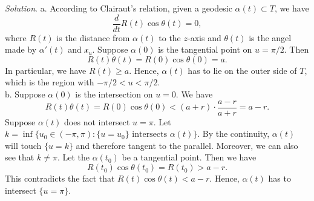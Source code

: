 \documentclass[12pt]{article}
\begin{document}
\textit{Solution}. 
a. According to Clairaut's relation, given a geodesic $\alpha(t)\subset T$, we have \begin{equation*}
    \frac{d}{dt} R(t)\cos\theta(t) = 0,
\end{equation*}
where $R(t)$ is the distance from $\alpha(t)$ to the $z$-axis and $\theta(t)$ is the angel made by $\alpha'(t)$ and $\mathcal{x}_u$. Suppose $\alpha(0)$ is the tangential point on $u = \pi/2$. Then \begin{equation*}
    R(t)\theta(t) = R(0)\cos\theta(0)= a.
\end{equation*}
In particular, we have $R(t)\geq a$. Hence, $\alpha(t)$ has to lie on the outer side of $T$, which is the region with $-\pi/2<u<\pi/2$.\\

b. Suppose $\alpha(0)$ is the intersection on $u = 0$. We have  \begin{equation*}
    R(t)\theta(t) = R(0)\cos\theta(0) < (a+r)\cdot \frac{a-r}{a+r} = a-r.
\end{equation*}
Suppose $\alpha(t)$ does not intersect $u=\pi$. Let $k = \inf\{u_0\in (-\pi,\pi):\text{$\{u=u_0\}$ intersects $\alpha(t)$}\}$. By the continuity, $\alpha(t)$ will touch $\{u=k\}$ and therefore tangent to the parallel. Moreover, we can also see that $k\neq \pi$. Let the $\alpha(t_0)$ be a tangential point. Then we have \begin{equation*}
    R(t_0)\cos\theta(t_0) = R(t_0) > a - r.
\end{equation*}
This contradicts the fact that $R(t)\cos\theta(t) < a-r$. Hence, 
$\alpha(t)$ has to intersect $\{u=\pi\}$.
\end{document}
